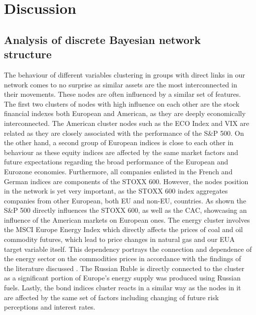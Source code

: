 \documentclass[12pt, letterpaper]{article}
\begin{document}
\pagestyle{fancy}
\section{Discussion}
\subsection{Analysis of discrete Bayesian network structure}

The behaviour of different variables clustering in groups with direct links in our network comes to no surprise as similar assets are the most interconnected in their movements. These nodes are often influenced by a similar set of features. The first two clusters of nodes with high influence on each other are the stock financial indexes both European and American, as they are deeply economically interconnected. The American cluster nodes such as the ECO Index and VIX are related as they are closely associated with the performance of the S\&P 500. On the other hand, a second group of European indices is close to each other in behaviour as these equity indices are affected by the same market factors and future expectations regarding the broad performance of the European and Eurozone economies. Furthermore, all companies enlisted in the French and German indices are components of the STOXX 600. However, the nodes position in the network is yet very important, as the STOXX 600 index aggregates companies from other European, both EU and non-EU, countries. As shown the S\&P 500 directly influences the STOXX 600, as well as the CAC, showcasing an influence of the American markets on European ones. The energy cluster involves the MSCI Europe Energy Index which directly affects the prices of coal and oil commodity futures, which lead to price changes in natural gas and our EUA target variable itself. This dependency portrays the connection and dependence of the energy sector on the commodities prices in accordance with the findings of the literature discussed \parencite{lovcha2021, salvagnin2024}. The Russian Ruble is directly connected to the cluster as a significant portion of Europe’s energy supply was produced using Russian fuels. Lastly, the bond indices cluster reacts in a similar way as the nodes in it are affected by the same set of factors including changing of future risk perceptions and interest rates.
\end{document}
